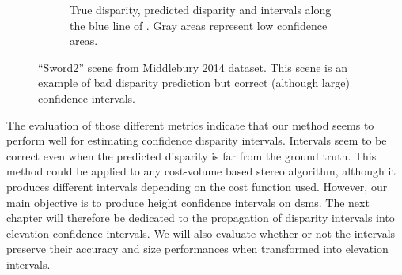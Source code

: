 \begin{figure}
\begin{subfigure}[t]{1\linewidth}
        \caption{True disparity, predicted disparity and intervals along the blue line of . Gray areas represent low confidence areas.}
        \label{fig:sword2_c}
    \end{subfigure}
    \caption{``Sword2'' scene from Middlebury 2014 dataset. This scene is an example of bad disparity prediction but correct (although large) confidence intervals.}
    \label{fig:sword2}
\end{figure}

The evaluation of those different metrics indicate that our method seems to perform well for estimating confidence disparity intervals. Intervals seem to be correct even when the predicted disparity is far from the ground truth. This method could be applied to any cost-volume based stereo algorithm, although it produces different intervals depending on the cost function used. However, our main objective is to produce height confidence intervals on \acrshort{dsm}s. The next chapter will therefore be dedicated to the propagation of disparity intervals into elevation confidence intervals. We will also evaluate whether or not the intervals preserve their accuracy and size performances when transformed into elevation intervals.


\pagebreak
\blankpage
